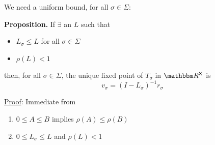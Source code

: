 \documentclass[xcolor=tex,dvipsnames]{beamer}
\begin{document}
\begin{frame}

    We need a uniform bound, for all $\sigma \in \Sigma$:

    \vspace{0.4em}
    \vspace{0.4em}
    \begin{block}{\vspace*{-3ex}}
        {\bf Proposition.} If $\exists$ an $L$ such that 
            \vspace{0.4em}
        \begin{itemize}
            \item $L_\sigma \leq L$ for all $\sigma \in \Sigma$
            \vspace{0.4em}
            \item $\rho(L) < 1$
        \end{itemize}
        \vspace{0.4em}
        then, for all $\sigma \in \Sigma$, the unique fixed point of $T_\sigma$
        in $\RR^\Xsf$ is
        \begin{equation*}
            v_\sigma = (I - L_\sigma)^{-1} r_\sigma
        \end{equation*}
    \end{block}

    
        \vspace{0.4em}
    \underline{Proof}: Immediate from 
    \begin{enumerate}
        \item $0 \leq A \leq B$ implies $\rho(A) \leq \rho(B)$
        \vspace{0.4em}
        \item $0 \leq L_\sigma \leq L$ and $\rho(L) < 1$
    \end{enumerate}

\end{frame}
\end{document}
